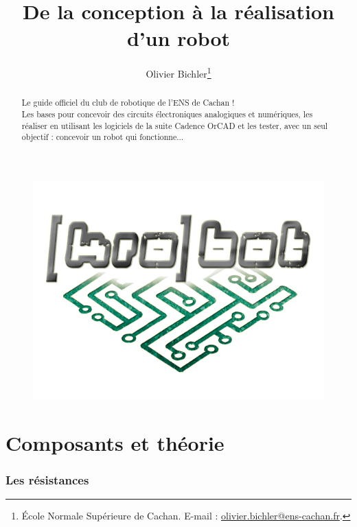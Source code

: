 \documentclass[a4paper]{article}
\title{De la conception à la réalisation d'un robot}
\author{Olivier Bichler\footnote{École Normale Supérieure de Cachan. E-mail : \href{mailto:olivier.bichler@ens-cachan.fr}{olivier.bichler@ens-cachan.fr}.}}
\begin{document}
\maketitle		%

\begin{figure}[H]
	\centering
	\includegraphics[scale=0.75]{Images/Logo.png}
\end{figure}

\begin{abstract}		%
Le guide officiel du club de robotique de l'ENS de Cachan !\\
Les bases pour concevoir des circuits électroniques analogiques et numériques, les réaliser en utilisant les logiciels de la suite Cadence OrCAD et les tester, avec un seul objectif : concevoir un robot qui fonctionne...
\end{abstract}

\newpage

\tableofcontents		%
\newpage


\part{Composants et théorie}

\section{Les résistances}
\end{document}
